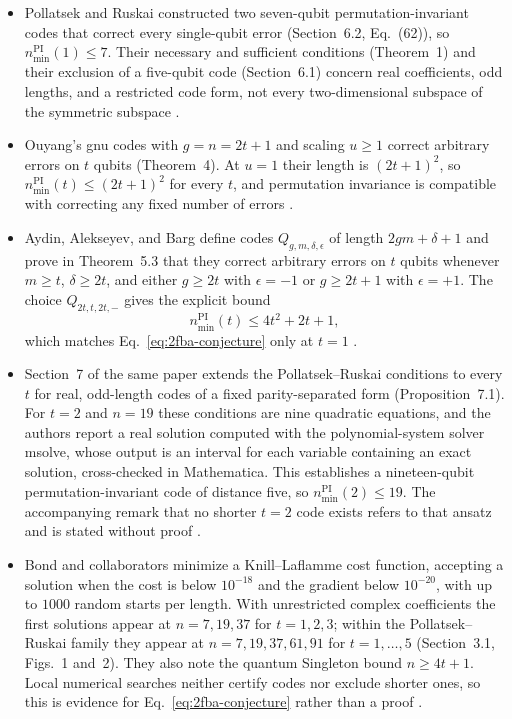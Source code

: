 \begin{itemize}
  \item Pollatsek and Ruskai constructed two seven-qubit permutation-invariant
  codes that correct every single-qubit error (Section~6.2, Eq.~(62)), so
  $n_{\min}^{\mathrm{PI}}(1)\leq7$.  Their necessary and sufficient conditions
  (Theorem~1) and their exclusion of a five-qubit code (Section~6.1) concern real
  coefficients, odd lengths, and a restricted code form, not every
  two-dimensional subspace of the symmetric subspace
  .

  \item Ouyang's gnu codes with $g=n=2t+1$ and scaling $u\geq1$ correct arbitrary
  errors on $t$ qubits (Theorem~4).  At $u=1$ their length is $(2t+1)^2$, so
  $n_{\min}^{\mathrm{PI}}(t)\leq(2t+1)^2$ for every $t$, and permutation
  invariance is compatible with correcting any fixed number of errors
  .

  \item Aydin, Alekseyev, and Barg define codes $Q_{g,m,\delta,\epsilon}$ of length
  $2gm+\delta+1$ and prove in Theorem~5.3 that they correct arbitrary errors on
  $t$ qubits whenever $m\geq t$, $\delta\geq 2t$, and either $g\geq 2t$ with
  $\epsilon=-1$ or $g\geq 2t+1$ with $\epsilon=+1$.  The choice
  $Q_{2t,t,2t,-}$ gives the explicit bound
  \begin{equation}
    n_{\min}^{\mathrm{PI}}(t)\leq 4t^2+2t+1 ,
    \label{eq:2fba-aab-bound}
  \end{equation}
  which matches Eq.~\eqref{eq:2fba-conjecture} only at $t=1$
  .

  \item Section~7 of the same paper extends the Pollatsek--Ruskai conditions to
  every $t$ for real, odd-length codes of a fixed parity-separated form
  (Proposition~7.1).  For $t=2$ and $n=19$ these conditions are nine quadratic
  equations, and the authors report a real solution computed with the
  polynomial-system solver msolve, whose output is an interval for each
  variable containing an exact solution, cross-checked in Mathematica.  This
  establishes a nineteen-qubit permutation-invariant code of distance five, so
  $n_{\min}^{\mathrm{PI}}(2)\leq19$.  The accompanying remark that no shorter
  $t=2$ code exists refers to that ansatz and is stated without proof
  .

  \item Bond and collaborators minimize a Knill--Laflamme cost function, accepting a
  solution when the cost is below $10^{-18}$ and the gradient below $10^{-20}$,
  with up to $1000$ random starts per length.  With unrestricted complex
  coefficients the first solutions appear at $n=7,19,37$ for $t=1,2,3$; within
  the Pollatsek--Ruskai family they appear at $n=7,19,37,61,91$ for
  $t=1,\dots,5$ (Section~3.1, Figs.~1 and~2).  They also note the quantum
  Singleton bound $n\geq 4t+1$.  Local numerical searches neither certify codes
  nor exclude shorter ones, so this is evidence for
  Eq.~\eqref{eq:2fba-conjecture} rather than a proof
  .


\end{itemize}
